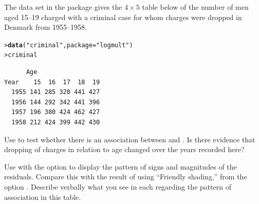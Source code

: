 \documentclass[10pt]{report}\usepackage[]{graphicx}\usepackage[]{color}
\makeatletter
\newcommand{\hlstr}[1]{\textcolor[rgb]{0.192,0.494,0.8}{#1}}%
\newcommand{\hlstd}[1]{\textcolor[rgb]{0.345,0.345,0.345}{#1}}%
\newcommand{\hlkwc}[1]{\textcolor[rgb]{0.333,0.667,0.333}{#1}}%
\newcommand{\hlkwd}[1]{\textcolor[rgb]{0.737,0.353,0.396}{\textbf{#1}}}%
\newenvironment{kframe}{%
 \def\at@end@of@kframe{}%
 \ifinner\ifhmode%
  \def\at@end@of@kframe{\end{minipage}}%
  \begin{minipage}{\columnwidth}%
 \fi\fi%
 \def\FrameCommand##1{\hskip\@totalleftmargin \hskip-\fboxsep
 \colorbox{shadecolor}{##1}\hskip-\fboxsep
     \hskip-\linewidth \hskip-\@totalleftmargin \hskip\columnwidth}%
 \MakeFramed {\advance\hsize-\width
   \@totalleftmargin\z@ \linewidth\hsize
   \@setminipage}}%
 {\par\unskip\endMakeFramed%
 \at@end@of@kframe}
\newenvironment{knitrout}{}{} %
\renewenvironment{knitrout}{\small\renewcommand{\baselinestretch}{.85}}{} %
\makeatother
\begin{document}
\begin{Exercises}

\exercise\label{lab:mosaic-criminal} The data set  in the package  gives the
$4 \times 5$ table below of the
number of men aged 15--19 charged with a criminal case for whom charges were dropped
in Denmark from 1955--1958.
\begin{knitrout}\footnotesize
{}\color{fgcolor}\begin{kframe}
\begin{alltt}
\hlstd{> }\hlkwd{data}\hlstd{(}\hlstr{"criminal"}\hlstd{,} \hlkwc{package} \hlstd{=} \hlstr{"logmult"}\hlstd{)}
\hlstd{> }\hlstd{criminal}
\end{alltt}
\begin{verbatim}
      Age
Year    15  16  17  18  19
  1955 141 285 320 441 427
  1956 144 292 342 441 396
  1957 196 380 424 462 427
  1958 212 424 399 442 430
\end{verbatim}
\end{kframe}
\end{knitrout}
  \begin{enumerate*}
    \item Use  to test whether there is an association between 
    and .  Is there evidence that dropping of charges in relation to
    age changed over the years recorded here?
    \begin{ans}
    \end{ans}
    
    \item Use  with the option  to display the
    pattern of signs and magnitudes of the residuals.  Compare this with the
    result of  using ``Friendly shading,'' from
    the option .  Describe verbally what you see
    in each regarding the pattern of association in this table.
    \begin{ans}
    \end{ans}
    
  \end{enumerate*}


\end{Exercises}
\end{document}
